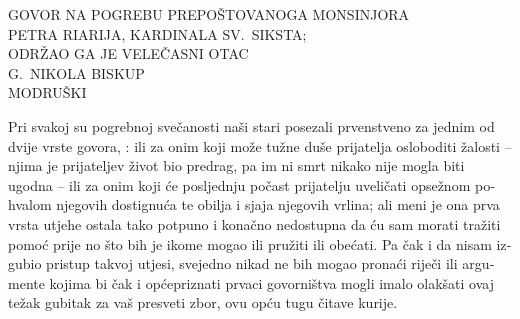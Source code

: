 \documentclass[a5paper,twoside]{article}
\begin{document}
\begin{pages}
\begin{Leftside}
\pend
\endnumbering

\end{Leftside}
\begin{Rightside}
\begin{croatian}
\beginnumbering
\pstart


{\centering
\noindent GOVOR NA POGREBU PREPOŠTOVANOGA MONSINJORA\\
PETRA RIARIJA, KARDINALA SV.\ SIKSTA;\\
ODRŽAO GA JE VELEČASNI OTAC\\
G.~NIKOLA BISKUP\\
MODRUŠKI

}

\pend\vspace*{\baselineskip}

\numberpstarttrue

\setcounter{pstart}{1}

\pstart
Pri svakoj su pogrebnoj svečanosti naši stari posezali prvenstveno za jednim od dvije vrste govora, : ili za onim koji može tužne duše prijatelja osloboditi žalosti – njima je prijateljev život bio predrag, pa im ni smrt nikako nije mogla biti ugodna – ili za onim koji će posljednju počast prijatelju uveličati opsežnom pohvalom njegovih dostignuća te obilja i sjaja njegovih vrlina; ali meni je ona prva vrsta utjehe ostala tako potpuno i konačno nedostupna da ću sam morati tražiti pomoć prije no što bih je ikome mogao ili pružiti ili obećati.  Pa čak i da nisam izgubio pristup takvoj utjesi, svejedno nikad ne bih mogao pronaći riječi ili argumente kojima bi čak i općepriznati prvaci govorništva mogli imalo olakšati ovaj težak gubitak za vaš presveti zbor, ovu opću tugu čitave kurije.


\end{croatian}
\end{Rightside}
\end{pages}
\end{document}
